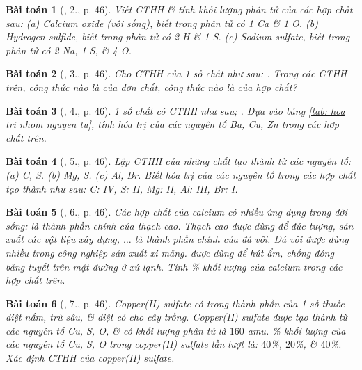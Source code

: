 \documentclass{article}
\newtheorem{baitoan}{Bài toán}
\begin{document}
\begin{baitoan}[\cite{SGK_KHTN_7_Canh_Dieu}, 2., p. 46]
	Viết {\rm CTHH} \& tính khối lượng phân tử của các hợp chất sau: (a) Calcium oxide (vôi sống), biết trong phân tử có \emph{1 Ca \& 1 O}. (b) Hydrogen sulfide, biết trong phân tử có \emph{2 H \& 1 S}. (c) Sodium sulfate, biết trong phân tử có \emph{2 Na, 1 S, \& 4 O}.
\end{baitoan}

\begin{baitoan}[\cite{SGK_KHTN_7_Canh_Dieu}, 3., p. 46]
	Cho {\rm CTHH} của 1 số chất như sau: \emph{}. Trong các {\rm CTHH} trên, công thức nào là của đơn chất, công thức nào là của hợp chất?
\end{baitoan}

\begin{baitoan}[\cite{SGK_KHTN_7_Canh_Dieu}, 4., p. 46]
	1 số chất có {\rm CTHH} như sau; \emph{}. Dựa vào bảng \ref{tab: hoa tri nhom nguyen tu}, tính hóa trị của các nguyên tố \emph{Ba, Cu, Zn} trong các hợp chất trên.
\end{baitoan}

\begin{baitoan}[\cite{SGK_KHTN_7_Canh_Dieu}, 5., p. 46]
	Lập {\rm CTHH} của những chất tạo thành từ các nguyên tố: (a) \emph{C, S}. (b) \emph{Mg, S}. (c) \emph{Al, Br}. Biết hóa trị của các nguyên tố trong các hợp chất tạo thành như sau: \emph{C: IV, S: II, Mg: II, Al: III, Br: I}.
\end{baitoan}

\begin{baitoan}[\cite{SGK_KHTN_7_Canh_Dieu}, 6., p. 46]
	Các hợp chất của calcium có nhiều ứng dụng trong đời sống: \emph{} là thành phần chính của thạch cao. Thạch cao được dùng để đúc tượng, sản xuất các vật liệu xây dựng, $\ldots$ \emph{} là thành phần chính của đá vôi. Đá vôi được dùng nhiều trong công nghiệp sản xuất xi măng. \emph{} được dùng để hút ẩm, chống đóng băng tuyết trên mặt đường ở xứ lạnh. Tính \% khối lượng của calcium trong các hợp chất trên.
\end{baitoan}

\begin{baitoan}[\cite{SGK_KHTN_7_Canh_Dieu}, 7., p. 46]
	Copper(II) sulfate có trong thành phần của 1 số thuốc diệt nấm, trừ sâu, \& diệt cỏ cho cây trồng. Copper(II) sulfate được tạo thành từ các nguyên tố \emph{Cu, S, O}, \& có khối lượng phân tử là $160$ amu. \% khối lượng của các nguyên tố \emph{Cu, S, O} trong copper(II) sulfate lần lượt là: $40$\%, $20$\%, \& $40$\%. Xác định {\rm CTHH} của copper(II) sulfate. 
\end{baitoan}
\end{document}
